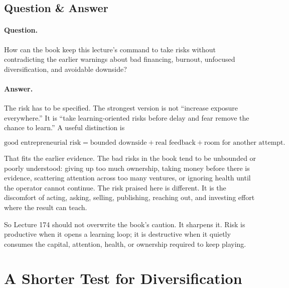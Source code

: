 \documentclass[11pt,oneside]{book}
\begin{document}
\subsection{Question \& Answer}

\paragraph{Question.}
How can the book keep this lecture's command to take risks without contradicting the earlier warnings about bad financing, burnout, unfocused diversification, and avoidable downside?

\paragraph{Answer.}
The risk has to be specified. The strongest version is not ``increase exposure everywhere.'' It is ``take learning-oriented risks before delay and fear remove the chance to learn.'' A useful distinction is

\begin{equation}
\text{good entrepreneurial risk}
=
\text{bounded downside}
+
\text{real feedback}
+
\text{room for another attempt}.
\end{equation}

That fits the earlier evidence. The bad risks in the book tend to be unbounded or poorly understood: giving up too much ownership, taking money before there is evidence, scattering attention across too many ventures, or ignoring health until the operator cannot continue. The risk praised here is different. It is the discomfort of acting, asking, selling, publishing, reaching out, and investing effort where the result can teach.

So Lecture 174 should not overwrite the book's caution. It sharpens it. Risk is productive when it opens a learning loop; it is destructive when it quietly consumes the capital, attention, health, or ownership required to keep playing.


\section{A Shorter Test for Diversification}
\end{document}
